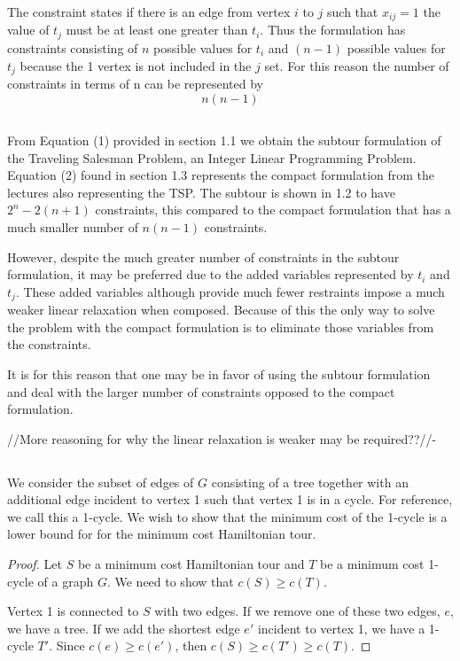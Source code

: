 \documentclass[11pt,a4paper,english]{article}
\begin{document}
The constraint states if there is an edge from vertex $i$ to $j$ such that $x_{ij} = 1$ the value of $t_{j}$ must be at least one greater than $t_{i}$. Thus the formulation has constraints consisting of $n$ possible values for $t_{i}$ and $(n-1)$ possible values for $t_{j}$ because the 1 vertex is not included in the $j$ set. For this reason the number of constraints in terms of n can be represented by $$n(n-1)$$

\subsection{}
From Equation (1) provided in section 1.1 we obtain the subtour formulation of the Traveling Salesman Problem, an Integer Linear Programming Problem.
Equation (2) found in section 1.3 represents the compact formulation from the lectures also representing the TSP. The subtour is shown in 1.2 to have $2^n - 2(n+1)$ constraints, this compared to the compact formulation that has a much smaller number of $n(n-1)$ constraints. 

However, despite the much greater number of constraints in the subtour formulation, it may be preferred due to the added variables represented by $t_{i}$ and $t_{j}$. These added variables although provide much fewer restraints impose a much weaker linear relaxation when composed. Because of this the only way to solve the problem with the compact formulation is to eliminate those variables from the constraints. 


It is for this reason that one may be in favor of using the subtour formulation and deal with the larger number of constraints opposed to the compact formulation.


//More reasoning for why the linear relaxation is weaker may be required??//-

\subsection{}
We consider the subset of edges of $G$ consisting of a tree together with an additional edge incident to vertex 1 such that vertex 1 is in a cycle. For reference, we call this a 1-cycle. We wish to show that the minimum cost of the 1-cycle is a lower bound for for the minimum cost Hamiltonian tour.

\begin{proof}
Let $S$ be a minimum cost Hamiltonian tour and $T$ be a minimum cost 1-cycle of a graph $G$. We need to show that $c(S) \geq c(T)$.

Vertex 1 is connected to $S$ with two edges. If we remove one of these two edges, $e$, we have a tree. If we add the shortest edge $e'$ incident to vertex 1, we have a 1-cycle $T'$. Since $c(e) \geq c(e')$, then $c(S) \geq c(T') \geq c(T)$.
\end{proof}
\end{document}
